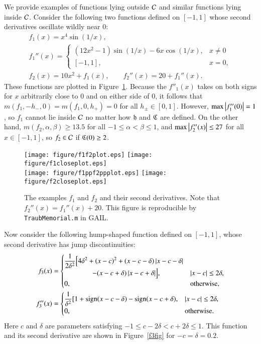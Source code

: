 \documentclass[review]{elsarticle}
\theoremstyle{definition}
\begin{document}
We provide examples of functions lying outside $\mathcal{C}$
and similar functions lying inside $\mathcal{C}$. Consider the following two functions defined
on $[-1,1]$ whose second derivatives oscillate wildly near $0$:
\begin{gather*}
f_1(x) = x^4 \sin(1/x), \\
 f_1''(x) = \begin{cases} (12x^2 - 1) \sin(1/x) -6 x \cos(1/x), & x \ne 0 \\
 [-1,1], & x = 0, \end{cases} \\
f_2(x) = 10  x^2 + f_1(x), \qquad f_2''(x) = 20+ f_1''(x).
\end{gather*}
These functions are plotted in Figure~\ref{f1f2fig}. Because the $f''_1(x)$
takes on both signs for $x$ arbitrarily close to $0$ and on either side of $0$,
it follows that  $m(f_1,-h_-,0) = m(f_1,0,h_+) = 0$ for all $h_\pm \in [0,1]$.
However, $\max\left \lvert f''_1(0) \right \rvert = 1$, so $f_1$ cannot lie inside
$\mathcal{C}$ no matter how $\mathfrak{h}$ and $\mathfrak{C}$ are defined. On the other hand,
$m(f_2,\alpha, \beta) \ge 13.5$ for all $-1 \le \alpha < \beta \le 1$, and
$\max \left \lvert f''_2(x) \right \rvert \le 27$ for all $x \in [-1,1]$, so $f_2 \in
\mathcal{C}$ if $\mathfrak{C}(0) \ge 2$.

\begin{figure}[t]
\centering
\texttt{[image: figure/f1f2plot.eps]} \quad
\texttt{[image: figure/f1closeplot.eps]} \\
\texttt{[image: figure/f1ppf2ppplot.eps]} \quad
\texttt{[image: figure/f2closeplot.eps]}
\caption{The examples $f_1$ and $f_2$ and their second derivatives. Note that
$f_2''(x) = f_1''(x) + 20$. This figure is reproducible by {\tt TraubMemorial.m}
in GAIL.}
\label{f1f2fig}
\end{figure}

Now consider the following hump-shaped function defined on $[-1,1]$, whose second derivative has jump discontinuities:
\begin{align} \label{f3def}
f_3(x) & = \begin{cases} \displaystyle
   \frac{1}{2\delta^2} \Bigl [4 \delta^2 + (x-c)^2 + (x-c-\delta)\left \lvert x-c-\delta \right \rvert
\\ \qquad \qquad
    - (x-c+\delta)\left \lvert x-c+\delta \right \rvert \Bigr ], & \left \lvert x-c \right \rvert \le 2\delta,
\\ 0, & \text{otherwise},
\end{cases} \\
\nonumber
f''_3(x) & =
\begin{cases} \displaystyle
    \frac{1}{\delta^2} [1 + \operatorname{sign}(x-c-\delta) - \operatorname{sign}(x-c+\delta), & \left \lvert x-c \right \rvert \le 2\delta,
\\ 0, & \text{otherwise}.
\end{cases}
\end{align}
Here $c$ and $\delta$ are parameters satisfying $-1 \le c-2 \delta < c+ 2\delta \le 1$. This function and its second derivative
are shown in Figure~\ref{f3fig} for $-c=\delta = 0.2$.
\end{document}
